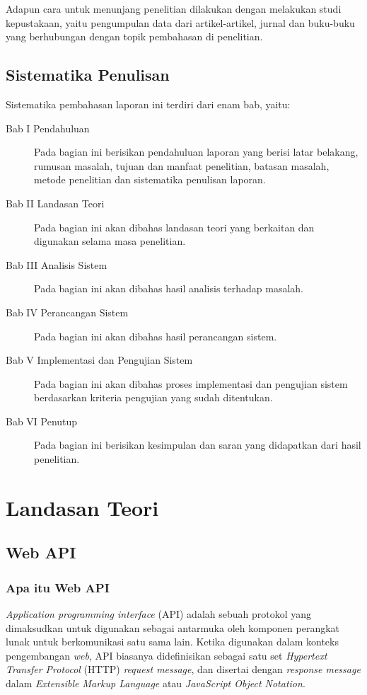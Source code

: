 \documentclass[a4paper, 12pt, oneside]{report}
\begin{document}
\onehalfspacing Adapun cara untuk menunjang penelitian dilakukan dengan melakukan studi kepustakaan, yaitu pengumpulan data dari artikel-artikel, jurnal dan buku-buku yang berhubungan dengan topik pembahasan di penelitian.

\section{Sistematika Penulisan}
Sistematika pembahasan laporan ini terdiri dari enam bab, yaitu:
\begin{description}
  \item[Bab I Pendahuluan] Pada bagian ini berisikan pendahuluan laporan yang berisi latar belakang, rumusan masalah, tujuan dan manfaat penelitian, batasan masalah, metode penelitian dan sistematika penulisan laporan.
  \item[Bab II Landasan Teori] Pada bagian ini akan dibahas landasan teori yang berkaitan dan digunakan selama masa penelitian.
  \item[Bab III Analisis Sistem] Pada bagian ini akan dibahas hasil analisis terhadap masalah.
  \item[Bab IV Perancangan Sistem] Pada bagian ini akan dibahas hasil perancangan sistem.
  \item[Bab V Implementasi dan Pengujian Sistem] Pada bagian ini akan dibahas proses implementasi dan pengujian sistem berdasarkan kriteria pengujian yang sudah ditentukan.
  \item[Bab VI Penutup] Pada bagian ini berisikan kesimpulan dan saran yang didapatkan dari hasil penelitian.
\end{description}

\chapter{Landasan Teori}

\section{Web API}
\onehalfspacing
\subsection{Apa itu Web API}

\onehalfspacing \textit{Application programming interface} (API) adalah sebuah protokol yang dimaksudkan untuk digunakan sebagai antarmuka oleh komponen perangkat lunak untuk berkomunikasi satu sama lain. Ketika digunakan dalam konteks pengembangan \textit{web}, API biasanya didefinisikan sebagai satu set \textit{Hypertext Transfer Protocol} (HTTP) \textit{request message}, dan disertai dengan \textit{response message} dalam \textit{Extensible Markup Language} atau \textit{JavaScript Object Notation}.
\end{document}

